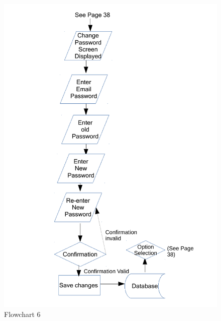 \begin{figure}[H]
    \caption{Flowchart 6} \label{Flowchart_6.pdf}
    \includegraphics[width=\textwidth]{./Design/Flowcharts/Flowchart_6.pdf}
\end{figure}

